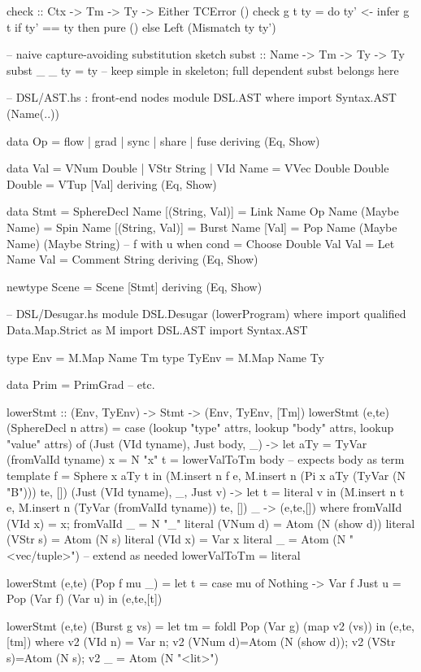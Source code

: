 \documentclass[12pt,a4paper]{article}
\theoremstyle{definition}
\theoremstyle{plain}
\begin{document}
check :: Ctx -> Tm -> Ty -> Either TCError ()
check g t ty = do
  ty' <- infer g t
  if ty' == ty then pure () else Left (Mismatch ty ty')

-- naive capture-avoiding substitution sketch
subst :: Name -> Tm -> Ty -> Ty
subst _ _ ty = ty  -- keep simple in skeleton; full dependent subst belongs here

-- DSL/AST.hs : front-end nodes
module DSL.AST where
import Syntax.AST (Name(..))

data Op = flow | grad | sync | share | fuse deriving (Eq, Show)

data Val
  = VNum Double | VStr String | VId Name
  = VVec Double Double Double
  = VTup [Val]
  deriving (Eq, Show)

data Stmt
  = SphereDecl Name [(String, Val)]
  = Link Name Op Name (Maybe Name)
  = Spin Name [(String, Val)]
  = Burst Name [Val]
  = Pop Name (Maybe Name) (Maybe String) -- f with u when cond
  = Choose Double Val Val
  = Let Name Val
  = Comment String
  deriving (Eq, Show)

newtype Scene = Scene [Stmt] deriving (Eq, Show)

-- DSL/Desugar.hs
module DSL.Desugar (lowerProgram) where
import qualified Data.Map.Strict as M
import DSL.AST
import Syntax.AST

type Env = M.Map Name Tm
type TyEnv = M.Map Name Ty

data Prim = PrimGrad  -- \nabla etc.

lowerStmt :: (Env, TyEnv) -> Stmt -> (Env, TyEnv, [Tm])
lowerStmt (e,te) (SphereDecl n attrs) =
  case (lookup "type" attrs, lookup "body" attrs, lookup "value" attrs) of
    (Just (VId tyname), Just body, _) ->
      let aTy = TyVar (fromValId tyname)
          x   = N "x"
          t   = lowerValToTm body       -- expects body as term template
          f   = Sphere x aTy t
      in (M.insert n f e, M.insert n (Pi x aTy (TyVar (N "B"))) te, [])
    (Just (VId tyname), _, Just v) ->
      let t = literal v in (M.insert n t e, M.insert n (TyVar (fromValId tyname)) te, [])
    _ -> (e,te,[])
  where
    fromValId (VId x) = x; fromValId _ = N "_"
    literal (VNum d)  = Atom (N (show d))
    literal (VStr s)  = Atom (N s)
    literal (VId x)   = Var x
    literal _         = Atom (N "<vec/tuple>") -- extend as needed
    lowerValToTm = literal

lowerStmt (e,te) (Pop f mu _) =
  let t = case mu of
            Nothing -> Var f
            Just u  = Pop (Var f) (Var u)
  in (e,te,[t])

lowerStmt (e,te) (Burst g vs) =
  let tm = foldl Pop (Var g) (map v2 (vs))
  in (e,te,[tm]) where v2 (VId n) = Var n; v2 (VNum d)=Atom (N (show d)); v2 (VStr s)=Atom (N s); v2 _ = Atom (N "<lit>")
\end{document}
